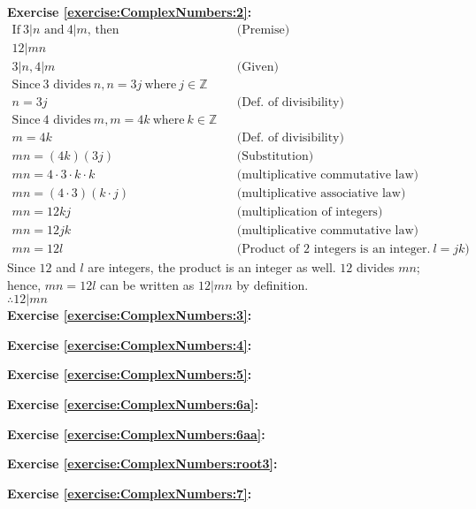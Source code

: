 \noindent\textbf{Exercise \ref{exercise:ComplexNumbers:2}:} %
\begin{align*}
\text{If}\  3|n \text{\ and}\  4|m\text{, then}\ &		&\text{(Premise)}\\
12|mn&		\\
3|n, 4|m&		&\text{(Given)}\\
\text{Since}\ 3 \text{\ divides} \ n, n = 3j\ \text{where}\ j \in {\mathbb{Z}}\\
n = 3j&		&\text{(Def. of divisibility)}\\
\text{Since}\ 4 \text{\ divides} \ m, m = 4k\ \text{where}\ k \in {\mathbb{Z}}\\
m = 4k&	&\text{(Def. of divisibility)}\\
mn = (4k)(3j)&	&\text{(Substitution)}\\
mn = 4 \cdot 3 \cdot k \cdot k&	&\text{(multiplicative commutative law)}\\
mn = (4 \cdot 3)(k \cdot j)&	&\text{(multiplicative associative law)}\\
mn = 12kj&	&\text{(multiplication of integers)}\\
mn = 12jk&	&\text{(multiplicative commutative law)}\\
mn = 12l&	&\text{(Product of 2 integers is an integer.}\ l = jk)
\end{align*}
Since $12$ and $l$ are integers, the product is an integer as well. $12$ divides $mn$; hence, $mn = 12l$ can be written as $12|mn$ by definition.\\
$\therefore 12|mn$\\

\noindent\textbf{Exercise \ref{exercise:ComplexNumbers:3}:}

\noindent\textbf{Exercise \ref{exercise:ComplexNumbers:4}:}

\noindent\textbf{Exercise \ref{exercise:ComplexNumbers:5}:}

\noindent\textbf{Exercise \ref{exercise:ComplexNumbers:6a}:}

\noindent\textbf{Exercise \ref{exercise:ComplexNumbers:6aa}:}

\noindent\textbf{Exercise \ref{exercise:ComplexNumbers:root3}:}

\noindent\textbf{Exercise \ref{exercise:ComplexNumbers:7}:}

